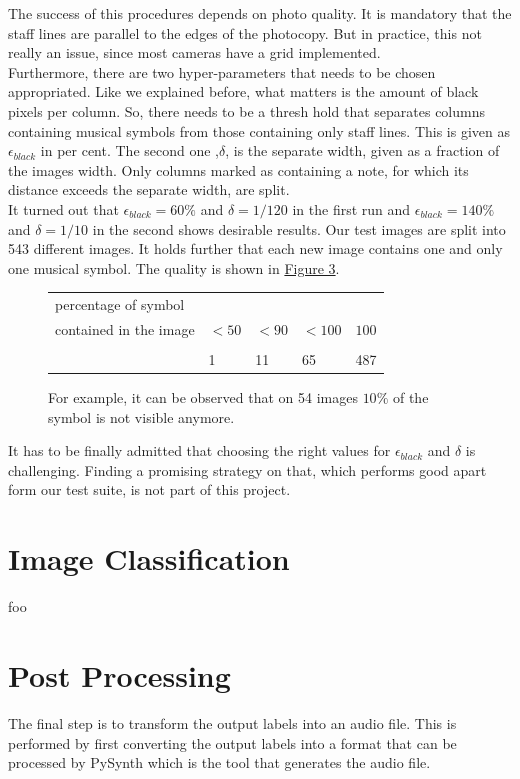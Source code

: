\documentclass[twocolumn]{article}
\begin{document}
The success of this procedures depends on photo quality. It is mandatory that the staff lines are parallel to the edges of the photocopy. But in practice, this not really an issue, since most cameras have a grid implemented. \\
Furthermore, there are two hyper-parameters that needs to be chosen appropriated. Like we explained before, what matters is the amount of black pixels per column. So, there needs to be a thresh hold that separates columns containing musical symbols from those containing only staff lines. This is given as $\epsilon_{black}$ in per cent. The second one ,$\delta$, is the separate width, given as a fraction of the images width. Only columns marked as containing a note, for which its distance exceeds the separate width, are split. \\
It turned out that $\epsilon_{black} = 60\% $ and $\delta = 1/120$ in the first run and $\epsilon_{black} = 140\%$ and $\delta = 1/10$ in the second shows desirable results. Our test images are split into 543 different images. It holds further that each new image contains one and only one musical symbol. The quality is shown in \hyperref[quality]{Figure 3}.

\begin{figure}
\begin{tabular}{l|l l l l}
 percentage of symbol  \\
 contained in the image  & $ < 50 $ & $ < 90 $ & $ < 100$ & $100$ \\
 \hline \\
 & 1 & 11 & 65 & 487 
\end{tabular}
\caption{For example, it can be observed that on 54 images $10 \%$ of the symbol is not visible anymore.}
\label{quality}
\end{figure}


It has to be finally admitted that choosing the right values for $\epsilon_{black}$ and $\delta$ is challenging. Finding a promising strategy on that, which performs good apart form our test suite, is not part of this project.  





\section{Image Classification}
foo

\section{Post Processing}
The final step is to transform the output labels into an audio file. This is performed by first converting the output labels into a format that can be processed by PySynth \cite{pysynth} which is the tool that generates the audio file. 


\newpage 


  
\end{document}
